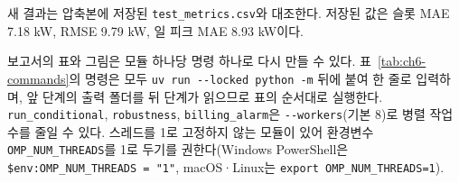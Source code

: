 새 결과는 압축본에 저장된 \texttt{test\_metrics.csv}와 대조한다. 저장된 값은 슬롯 MAE 7.18 kW, RMSE 9.79 kW, 일 피크 MAE 8.93 kW이다.


보고서의 표와 그림은 모듈 하나당 명령 하나로 다시 만들 수 있다. 표~\ref{tab:ch6-commands}의 명령은 모두 \texttt{uv run -{}-locked python -m} 뒤에 붙여 한 줄로 입력하며, 앞 단계의 출력 폴더를 뒤 단계가 읽으므로 표의 순서대로 실행한다. \texttt{run\_conditional}, \texttt{robustness}, \texttt{billing\_alarm}은 \texttt{-{}-workers}(기본 8)로 병렬 작업 수를 줄일 수 있다. 스레드를 1로 고정하지 않는 모듈이 있어 환경변수 \texttt{OMP\_NUM\_THREADS}를 1로 두기를 권한다(Windows PowerShell은 \texttt{\$env:OMP\_NUM\_THREADS = "1"}, macOS·Linux는 \texttt{export OMP\_NUM\_THREADS=1}).

